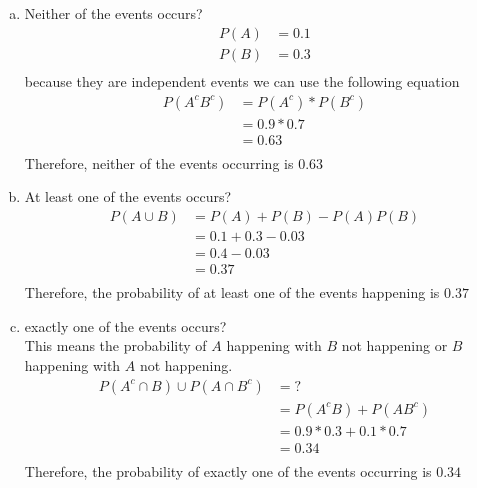 \documentclass[10pt]{report}
\begin{document}
 \subsection{}
  \begin{enumerate}[(a)]
  \item Neither of the events occurs? \\
  \begin{align*}
  P(A) &= 0.1 \\
  P(B) &= 0.3 \\
  \end{align*}
   because they are independent events we can use the following equation \\
     \begin{align*}
  P(A^cB^c) &= P(A^c) * P(B^c) \\
  &= 0.9 * 0.7 \\
  &= 0.63 \\
  \end{align*}
  Therefore, neither of the events occurring is $\mathbf{0.63} $
\item At least one of the events occurs?
\begin{align*}
P(A \cup B) &= P(A) + P(B) - P(A)P(B) \\
&= 0.1 + 0.3 - 0.03 \\
&= 0.4 - 0.03 \\
&= 0.37 \\
\end{align*}
Therefore, the probability of at least one of the events happening is $\mathbf{0.37} $
\item exactly one of the events occurs? \\
This means the probability of $A $ happening with $B $ not happening or $B $ happening with $A $ not happening. \\
\begin{align*}
P(A^c \cap B) \cup P(A \cap B^c) &= ? \\
&= P(A^cB) + P(AB^c) \\
&= 0.9*0.3 + 0.1*0.7 \\
&= 0.34 \\
\end{align*}
Therefore, the probability of exactly one of the events occurring is $\mathbf{0.34} $
\end{enumerate}
\setcounter{subsection}{7}
\end{document}
